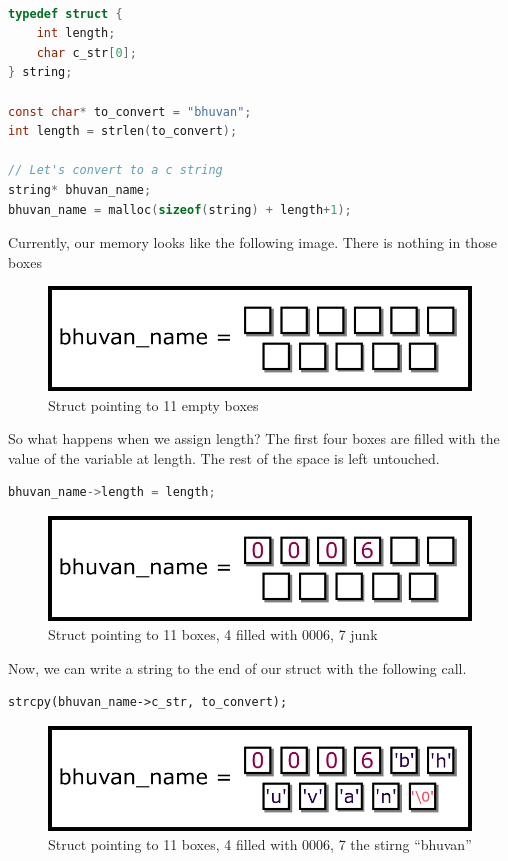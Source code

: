 \begin{lstlisting}[language=C]

typedef struct {
    int length;
    char c_str[0];
} string;

const char* to_convert = "bhuvan";
int length = strlen(to_convert);

// Let's convert to a c string
string* bhuvan_name;
bhuvan_name = malloc(sizeof(string) + length+1);
\end{lstlisting}

Currently, our memory looks like the following image. There is nothing in those boxes

\begin{figure}[H]
\centering
\includegraphics[width=.7\textwidth]{introc/drawings/memory_model_empty.png}
\caption{Struct pointing to 11 empty boxes}
\end{figure}

So what happens when we assign length?
The first four boxes are filled with the value of the variable at length.
The rest of the space is left untouched.

\begin{lstlisting}[language=C]
bhuvan_name->length = length;
\end{lstlisting}

\begin{figure}[H]
\centering
\includegraphics[width=.7\textwidth]{introc/drawings/memory_model_length.png}
\caption{Struct pointing to 11 boxes, 4 filled with 0006, 7 junk}
\end{figure}

Now, we can write a string to the end of our struct with the following call.

\begin{verbatim}
strcpy(bhuvan_name->c_str, to_convert);
\end{verbatim}

\begin{figure}[H]
\centering
\includegraphics[width=.7\textwidth]{introc/drawings/memory_model_full.png}
\caption{Struct pointing to 11 boxes, 4 filled with 0006, 7 the stirng ``bhuvan''}
\end{figure}

